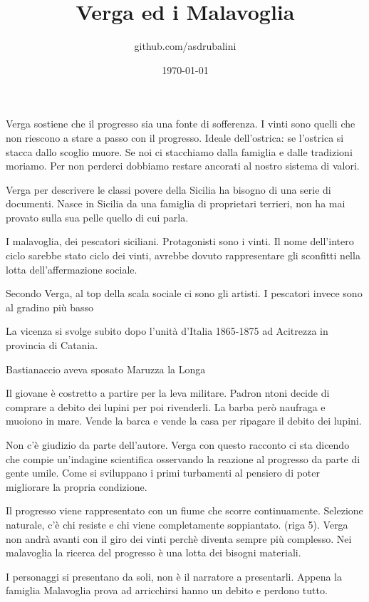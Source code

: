 \documentclass{article}
\title{Verga ed i Malavoglia}
\author{github.com/asdrubalini}
\date{\today}
\begin{document}
    \maketitle

    Verga sostiene che il progresso sia una fonte di sofferenza. I vinti sono quelli che non riescono a stare a passo con il progresso.
    Ideale dell'ostrica: se l'ostrica si stacca dallo scoglio muore. Se noi ci stacchiamo dalla famiglia e dalle tradizioni moriamo. Per non perderci dobbiamo restare ancorati al nostro sistema di valori.

    Verga per descrivere le classi povere della Sicilia ha bisogno di una serie di documenti. Nasce in Sicilia da una famiglia di proprietari terrieri, non ha mai provato sulla sua pelle quello di cui parla.

    I malavoglia, dei pescatori siciliani. Protagonisti sono i vinti. Il nome dell'intero ciclo sarebbe stato ciclo dei vinti, avrebbe dovuto rappresentare gli sconfitti nella lotta dell'affermazione sociale.

    Secondo Verga, al top della scala sociale ci sono gli artisti. I pescatori invece sono al gradino più basso

    La vicenza si svolge subito dopo l'unità d'Italia 1865-1875 ad Acitrezza in provincia di Catania. 

    Bastianaccio aveva sposato Maruzza la Longa

    Il giovane è costretto a partire per la leva militare. Padron ntoni decide di comprare a debito dei lupini per poi rivenderli. La barba però naufraga e muoiono in mare. Vende la barca e vende la casa per ripagare il debito dei lupini.


    Non c'è giudizio da parte dell'autore. Verga con questo racconto ci sta dicendo che compie un'indagine scientifica osservando la reazione al progresso da parte di gente umile. Come si sviluppano i primi turbamenti al pensiero di poter migliorare la propria condizione.

    Il progresso viene rappresentato con un fiume che scorre continuamente. Selezione naturale, c'è chi resiste e chi viene completamente soppiantato. (riga 5).
    Verga non andrà avanti con il giro dei vinti perchè diventa sempre più complesso.
    Nei malavoglia la ricerca del progresso è una lotta dei bisogni materiali.

    I personaggi si presentano da soli, non è il narratore a presentarli.
    Appena la famiglia Malavoglia prova ad arricchirsi hanno un debito e perdono tutto.
\end{document}
